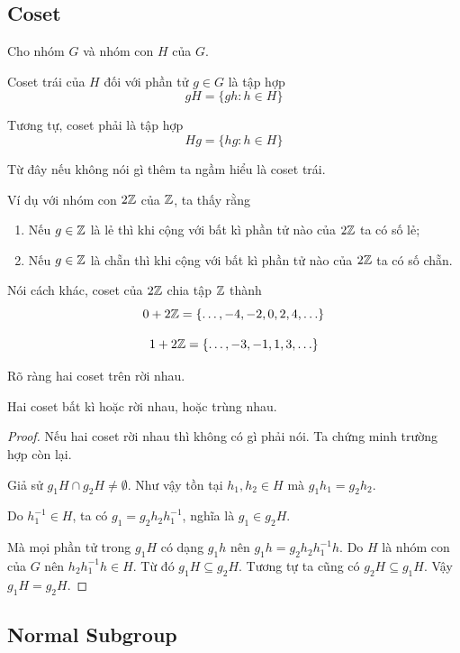 \subsection*{Coset}

\begin{definition}
    Cho nhóm $G$ và nhóm con $H$ của $G$.

    Coset trái của $H$ đối với phần tử $g \in G$ là tập hợp
    \[gH = \{gh : h \in H \}\]

    Tương tự, coset phải là tập hợp
    \[Hg = \{hg : h \in H \}\]
\end{definition}

Từ đây nếu không nói gì thêm ta ngầm hiểu là coset trái.

Ví dụ với nhóm con $2\mathbb{Z}$ của $\mathbb{Z}$, ta thấy rằng

\begin{enumerate}
    \item Nếu $g \in \mathbb{Z}$ là lẻ thì khi cộng với bất kì phần tử nào của $2\mathbb{Z}$ ta có số lẻ;
    \item Nếu $g \in \mathbb{Z}$ là chẵn thì khi cộng với bất kì phần tử nào của $2\mathbb{Z}$ ta có số chẵn.
\end{enumerate}

Nói cách khác, coset của $2\mathbb{Z}$ chia tập $\mathbb{Z}$ thành
\[0 + 2\mathbb{Z} = \{\ldots, -4, -2, 0, 2, 4, \ldots\}\]
 
\[1 + 2\mathbb{Z} = \{\ldots, -3, -1, 1, 3, \ldots \}\]

Rõ ràng hai coset trên rời nhau.

\begin{remark}
    Hai coset bất kì hoặc rời nhau, hoặc trùng nhau.
\end{remark}

\begin{proof}
    Nếu hai coset rời nhau thì không có gì phải nói. Ta chứng minh trường hợp còn lại.

    Giả sử $g_1 H \cap g_2 H \neq \emptyset$. Như vậy tồn tại $h_1, h_2 \in H$ mà $g_1 h_1 = g_2 h_2$.

    Do $h_1^{-1} \in H$, ta có $g_1 = g_2 h_2 h_1^{-1}$, nghĩa là $g_1 \in g_2 H$.

    Mà mọi phần tử trong $g_1 H$ có dạng $g_1 h$ nên $g_1 h = g_2 h_2 h_1^{-1} h$. Do $H$ là nhóm con của $G$ nên $h_2 h_1^{-1} h \in H$.
    Từ đó $g_1 H \subseteq g_2 H$. Tương tự ta cũng có $g_2 H \subseteq g_1 H$. Vậy $g_1 H = g_2 H$.
\end{proof}

\subsection*{Normal Subgroup}

